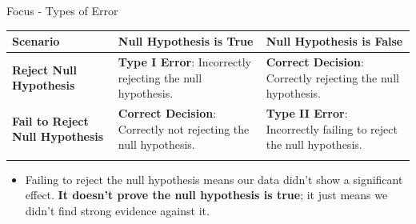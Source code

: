 \documentclass[
  ignorenonframetext,
]{beamer}
\providecommand{\tightlist}{%
  \setlength{\itemsep}{0pt}\setlength{\parskip}{0pt}}
\begin{document}
\begin{frame}{Focus - Types of Error}
\label{focus---types-of-error-2}
\begin{longtable}[]{@{}
  >{\raggedright\arraybackslash}p{}
  >{\raggedright\arraybackslash}p{}
  >{\raggedright\arraybackslash}p{}@{}}
\toprule\noalign{}
\begin{minipage}[b]{\linewidth}\raggedright
Scenario
\end{minipage} & \begin{minipage}[b]{\linewidth}\raggedright
Null Hypothesis is True
\end{minipage} & \begin{minipage}[b]{\linewidth}\raggedright
Null Hypothesis is False
\end{minipage} \\
\midrule\noalign{}
\endhead
\textbf{Reject Null Hypothesis} & \textbf{Type I Error}: Incorrectly
rejecting the null hypothesis. & \textbf{Correct Decision}: Correctly
rejecting the null hypothesis. \\
\textbf{Fail to Reject Null Hypothesis} & \textbf{Correct Decision}:
Correctly not rejecting the null hypothesis. & \textbf{Type II Error}:
Incorrectly failing to reject the null hypothesis. \\
\bottomrule\noalign{}
\end{longtable}

\small

\begin{itemize}
\tightlist
\item
  Failing to reject the null hypothesis means our data didn't show a
  significant effect. \textbf{It doesn't prove the null hypothesis is
  true}; it just means we didn't find strong evidence against it.\\
\end{itemize}
\end{frame}
\end{document}
